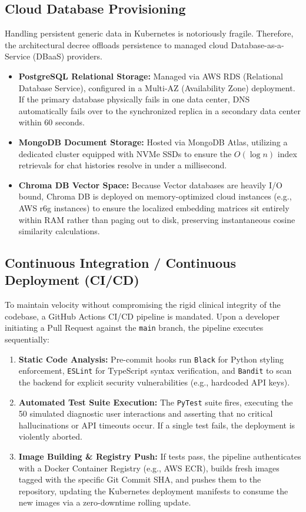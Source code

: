 \documentclass[12pt]{article}
\begin{document}
\subsection{Cloud Database Provisioning}
Handling persistent generic data in Kubernetes is notoriously fragile. Therefore, the architectural decree offloads persistence to managed cloud Database-as-a-Service (DBaaS) providers.
\begin{itemize}
    \item \textbf{PostgreSQL Relational Storage:} Managed via AWS RDS (Relational Database Service), configured in a Multi-AZ (Availability Zone) deployment. If the primary database physically fails in one data center, DNS automatically fails over to the synchronized replica in a secondary data center within 60 seconds.
    \item \textbf{MongoDB Document Storage:} Hosted via MongoDB Atlas, utilizing a dedicated cluster equipped with NVMe SSDs to ensure the $O(\log n)$ index retrievals for chat histories resolve in under a millisecond.
    \item \textbf{Chroma DB Vector Space:} Because Vector databases are heavily I/O bound, Chroma DB is deployed on memory-optimized cloud instances (e.g., AWS r6g instances) to ensure the localized embedding matrices sit entirely within RAM rather than paging out to disk, preserving instantaneous cosine similarity calculations.
\end{itemize}

\subsection{Continuous Integration / Continuous Deployment (CI/CD)}
To maintain velocity without compromising the rigid clinical integrity of the codebase, a GitHub Actions CI/CD pipeline is mandated.
Upon a developer initiating a Pull Request against the \texttt{main} branch, the pipeline executes sequentially:
\begin{enumerate}
    \item \textbf{Static Code Analysis:} Pre-commit hooks run \texttt{Black} for Python styling enforcement, \texttt{ESLint} for TypeScript syntax verification, and \texttt{Bandit} to scan the backend for explicit security vulnerabilities (e.g., hardcoded API keys).
    \item \textbf{Automated Test Suite Execution:} The \texttt{PyTest} suite fires, executing the 50 simulated diagnostic user interactions and asserting that no critical hallucinations or API timeouts occur. If a single test fails, the deployment is violently aborted.
    \item \textbf{Image Building \& Registry Push:} If tests pass, the pipeline authenticates with a Docker Container Registry (e.g., AWS ECR), builds fresh images tagged with the specific Git Commit SHA, and pushes them to the repository, updating the Kubernetes deployment manifests to consume the new images via a zero-downtime rolling update.
\end{enumerate}
\end{document}
